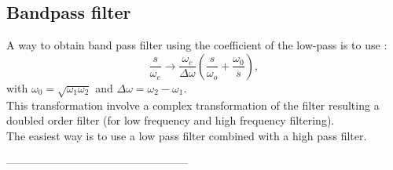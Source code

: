 \documentclass[twoside,twocolumn]{article}
\begin{document}
\subsection{Bandpass filter}
A  way to obtain band pass filter using the coefficient of the low-pass is to use :
\begin{equation}
\frac{s}{\omega_c}\rightarrow\frac{\omega_c}{\Delta\omega}(\frac{s}{\omega_o}+\frac{\omega_0}{s}),
\label{eq:lp2bp}
\end{equation}
with $\omega_0=\sqrt{\omega_1\omega_2}$ and $\Delta\omega=\omega_2-\omega_1$.\\
This transformation involve a complex transformation of the filter resulting a doubled order filter (for low frequency and high frequency filtering). \\
The easiest way is to use a low pass filter combined with a high pass filter.




\begin{thebibliography}{99} %

 
\end{thebibliography}--------------------------------------------------
\end{document}
